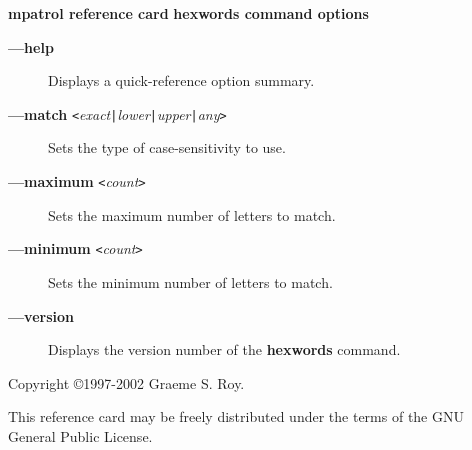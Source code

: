 \documentclass[a4paper,landscape,final]{article}
\newcommand{\heading}[1]{\textbf{\normalsize #1}}
\newcommand{\command}[1]{\textbf{#1}}
\newcommand{\flag}[1]{\textbf{---#1}}
\newcommand{\flagpar}[2]{\flag{#1} \texttt{<}\textit{#2}\texttt{>}}
\begin{document}
\begin{multicols}{3}{\textbf{\Large mpatrol reference card}}
\vskip 12pt
\heading{hexwords command options}
\vskip 6pt

\begin{description}
\item[\flag{help}]
Displays a quick-reference option summary.
\item[\flagpar{match}{exact\texttt{|}lower\texttt{|}upper\texttt{|}any}]
Sets the type of case-sensitivity to use.
\item[\flagpar{maximum}{count}]
Sets the maximum number of letters to match.
\item[\flagpar{minimum}{count}]
Sets the minimum number of letters to match.
\item[\flag{version}]
Displays the version number of the \command{hexwords} command.
\end{description}

\vskip 12pt
Copyright \copyright 1997-2002 Graeme S. Roy.
\vskip 6pt

This reference card may be freely distributed under the terms of the GNU General
Public License.

\end{multicols}
\end{document}
